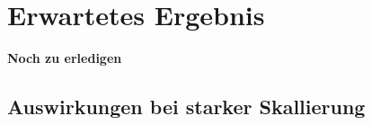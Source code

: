 \section{Erwartetes Ergebnis} 

\color{red}
\textbf{Noch zu erledigen}
\color{black}

\subsection{Auswirkungen bei starker Skallierung}





















